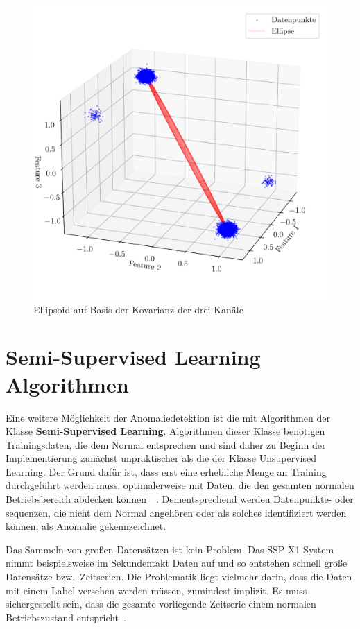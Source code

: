 \begin{figure}[t!]
    \centering
        \includegraphics[width=1\linewidth]{ch4_anomalien/abbildungen/EE_ellipse.pdf}
    \caption{Ellipsoid auf Basis der Kovarianz der drei Kanäle}
    \label{fig:ee_ellipse}
\end{figure}

\section{Semi-Supervised Learning Algorithmen}
Eine weitere Möglichkeit der Anomaliedetektion ist die mit Algorithmen der Klasse \textbf{Semi-Supervised Learning}. Algorithmen dieser Klasse benötigen
Trainingsdaten, die dem Normal entsprechen und sind daher zu Beginn der Implementierung zunächst unpraktischer als die der Klasse Unsupervised Learning.
Der Grund dafür ist, dass erst eine erhebliche Menge an Training durchgeführt werden muss, optimalerweise mit Daten, die den gesamten normalen Betriebsbereich
abdecken können~\cite[S.~2-4]{Chapelle2010}~\cite{Schmidl2022}. Dementsprechend werden Datenpunkte- oder sequenzen, die nicht dem Normal angehören oder
als solches identifiziert werden können, als Anomalie gekennzeichnet.

Das Sammeln von großen Datensätzen ist kein Problem. Das SSP X1 System nimmt beispielsweise im Sekundentakt Daten auf und so entstehen schnell große
Datensätze bzw.~Zeitserien. Die Problematik liegt vielmehr darin, dass die Daten mit einem Label versehen werden müssen, zumindest implizit. Es muss
sichergestellt sein, dass die gesamte vorliegende Zeitserie einem normalen Betriebszustand entspricht~\cite[S.~10~ff]{Chapelle2010}.

